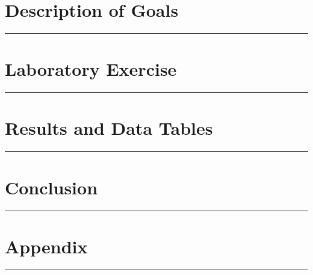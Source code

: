 \documentclass{article}
\begin{document}
\def\Author{John Doe}
\def\Class{ECE 101}
\def\ClassName{Principles of Electrical Engineering}
\def\LabNumber{1}
\def\LabName{Introduction to Lab}



\section*{Description of Goals}
\vspace{-0.1in}
\hrule
\vspace{5pt}

\section*{Laboratory Exercise}
\vspace{-0.1in}
\hrule
\vspace{5pt}

\section*{Results and Data Tables}
\vspace{-0.1in}
\hrule
\vspace{5pt}

%    



\section*{Conclusion}
\vspace{-0.1in}
\hrule
\vspace{5pt}


\pagebreak
\section*{Appendix}
\vspace{-0.1in}
\hrule
\vspace{5pt}

% 

\end{document}
